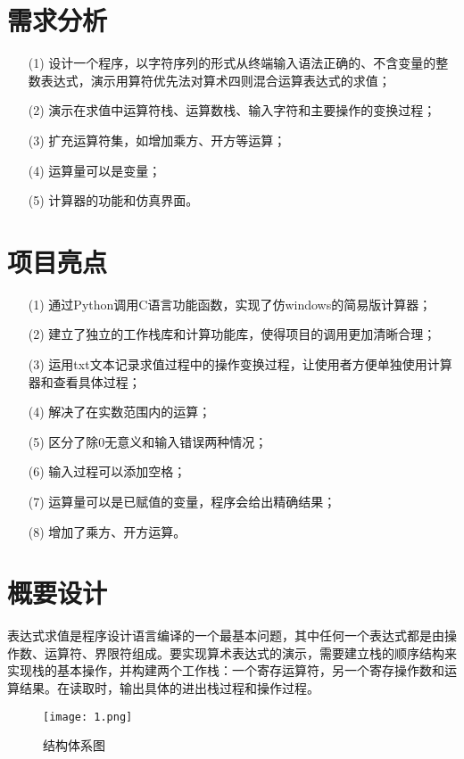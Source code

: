 \documentclass{DateStructure}
\begin{document}
	
\makecover
\newpage
\thispagestyle{empty}
\tableofcontents   

\newpage
\setcounter{page}{1}  
	
\section{需求分析}
\begin{itemize}
\item[(1)]设计一个程序，以字符序列的形式从终端输入语法正确的、不含变量的整数表达式，演示用算符优先法对算术四则混合运算表达式的求值；
\item[(2)]演示在求值中运算符栈、运算数栈、输入字符和主要操作的变换过程；
\item[(3)]扩充运算符集，如增加乘方、开方等运算；
\item[(4)]运算量可以是变量；
\item[(5)]计算器的功能和仿真界面。
\end{itemize}

\section{项目亮点}
\begin{itemize}
\item[(1)]通过Python调用C语言功能函数，实现了仿windows的简易版计算器；
\item[(2)]建立了独立的工作栈库和计算功能库，使得项目的调用更加清晰合理；
\item[(3)]运用txt文本记录求值过程中的操作变换过程，让使用者方便单独使用计算器和查看具体过程；
\item[(4)]解决了在实数范围内的运算；
\item[(5)]区分了除0无意义和输入错误两种情况；
\item[(6)]输入过程可以添加空格；
\item[(7)]运算量可以是已赋值的变量，程序会给出精确结果；
\item[(8)]增加了乘方、开方运算。
\end{itemize}

\section{概要设计}
表达式求值是程序设计语言编译的一个最基本问题，其中任何一个表达式都是由操作数、运算符、界限符组成。要实现算术表达式的演示，需要建立栈的顺序结构来实现栈的基本操作，并构建两个工作栈：一个寄存运算符，另一个寄存操作数和运算结果。在读取时，输出具体的进出栈过程和操作过程。\par
\begin{figure}[H] 
\centering
\texttt{[image: 1.png]}
\caption{结构体系图}
\end{figure}
\end{document}
